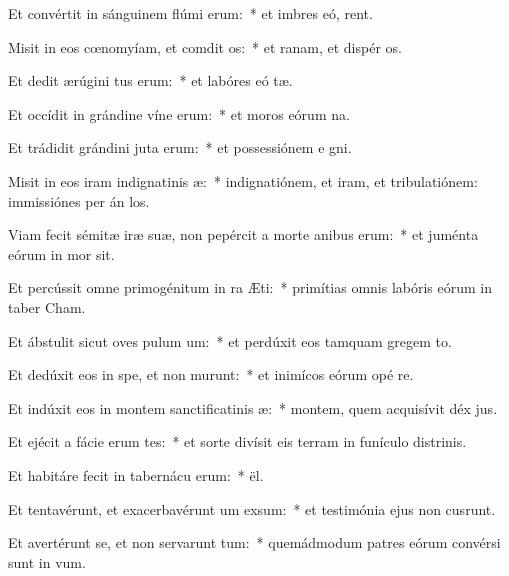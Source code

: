 \item Et convértit in sánguinem flúmi erum:~* et imbres eó,  rent.
\item Misit in eos cœnomyíam, et comdit os:~* et ranam, et dispér os.
\item Et dedit ærúgini tus erum:~* et labóres eó tæ.
\item Et occídit in grándine víne erum:~* et moros eórum  na.
\item Et trádidit grándini juta erum:~* et possessiónem e gni.
\item Misit in eos iram indignatinis æ:~* indignatiónem, et iram, et tribulatiónem: immissiónes per án los.
\item Viam fecit sémitæ iræ suæ, non pepércit a morte anibus erum:~* et juménta eórum in mor sit.
\item Et percússit omne primogénitum in ra Æti:~* primítias omnis labóris eórum in taber Cham.
\item Et ábstulit sicut oves pulum um:~* et perdúxit eos tamquam gregem  to.
\item Et dedúxit eos in spe, et non murunt:~* et inimícos eórum opé re.
\item Et indúxit eos in montem sanctificatinis æ:~* montem, quem acquisívit déx jus.
\item Et ejécit a fácie erum tes:~* et sorte divísit eis terram in funículo distrinis.
\item Et habitáre fecit in tabernácu erum:~*  ël.
\item Et tentavérunt, et exacerbavérunt um exsum:~* et testimónia ejus non cusrunt.
\item Et avertérunt se, et non servarunt tum:~* quemádmodum patres eórum convérsi sunt in  vum.
